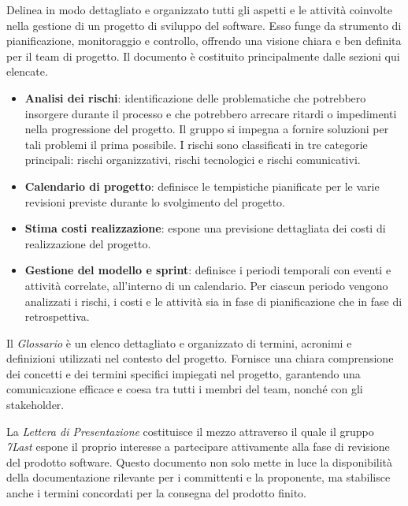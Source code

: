 Delinea in modo dettagliato e organizzato tutti gli aspetti e le attività coinvolte nella gestione di un progetto di sviluppo del software. Esso funge da strumento di pianificazione, monitoraggio e controllo, offrendo una visione chiara e ben definita per il team di progetto. Il documento è costituito principalmente dalle sezioni qui elencate.
\begin{itemize}
	\item \textbf{Analisi dei rischi}: identificazione delle problematiche che potrebbero insorgere durante il processo e che potrebbero arrecare ritardi o impedimenti nella progressione del progetto. Il gruppo si impegna a fornire soluzioni per tali problemi il prima possibile. I rischi sono classificati in tre categorie principali: rischi organizzativi, rischi tecnologici e rischi comunicativi.
	\item \textbf{Calendario di progetto}: definisce le tempistiche pianificate per le varie revisioni previste durante lo svolgimento del progetto. 
	\item \textbf{Stima costi realizzazione}: espone una previsione dettagliata dei costi di realizzazione del progetto.
	\item \textbf{Gestione del modello e sprint}: definisce i periodi temporali con eventi e attività correlate, all'interno di un calendario. Per ciascun periodo vengono analizzati i rischi, i costi e le attività sia in fase di pianificazione che in fase di retrospettiva.
\end{itemize}


Il \textit{Glossario} è un elenco dettagliato e organizzato di termini, acronimi e definizioni utilizzati nel contesto del progetto. Fornisce una chiara comprensione dei concetti e dei termini specifici impiegati nel progetto, garantendo una comunicazione efficace e coesa tra tutti i membri del team, nonché con gli stakeholder.

La \textit{Lettera di Presentazione} costituisce il mezzo attraverso il quale il gruppo \textit{7Last} espone il proprio interesse a partecipare attivamente alla fase di revisione del prodotto software. Questo documento non solo mette in luce la disponibilità della documentazione rilevante per i committenti e la proponente, ma stabilisce anche i termini concordati per la consegna del prodotto finito.

